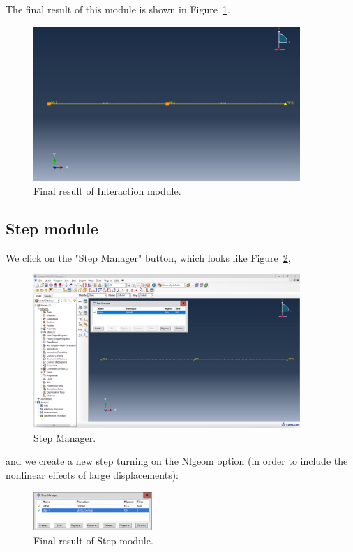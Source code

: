 The final result of this module is shown in Figure~\ref{fig:a11}.
\begin{figure}[H]
    \centering
    \includegraphics[width=0.9\textwidth]{Images/ab1/a11.png}
    \caption{Final result of Interaction module.}
    \label{fig:a11}
\end{figure} 

\newpage

\subsection{Step module}
\label{step_module1}%

We click on the "Step Manager" button, which looks like Figure~\ref{fig:a12},

\begin{figure}[H]
    \centering
    \includegraphics[width=0.9\textwidth]{Images/ab1/a12.png}
    \caption{Step Manager.}
    \label{fig:a12}
\end{figure}

and we create a new step turning on the Nlgeom option (in order to include the nonlinear effects of large displacements):
\begin{figure}[H]
    \centering
    \includegraphics[width=0.4\textwidth]{Images/ab1/a13.png}
    \caption{Final result of Step module.}
    \label{fig:a13}
\end{figure}

